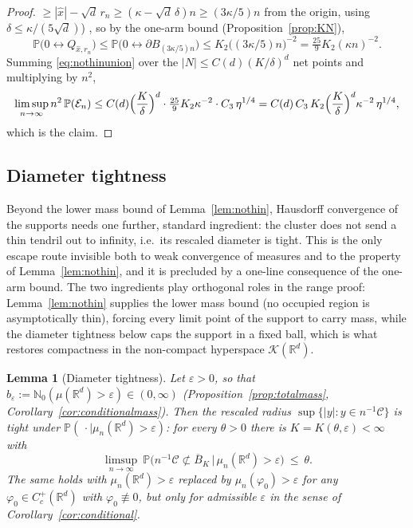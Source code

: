 \documentclass[11pt]{article}
\newtheorem{lemma}[theorem]{Lemma}
\theoremstyle{definition}
\theoremstyle{remark}
\newcommand{\R}{\mathbb{R}}
\newcommand{\bP}{\mathbb{P}}
\newcommand{\bN}{{\mathbb{N}_0}}                 %
\newcommand{\Cc}{C_c^+(\R^d)}
\newcommand{\eps}{\varepsilon}
\numberwithin{equation}{section}
\theoremstyle{plain}
\theoremstyle{definition}
\theoremstyle{remark}
\theoremstyle{plain}
\begin{document}
\begin{proof}
$\ge|\hat x|-\sqrt d\,r_n\ge(\kappa-\sqrt d\,\delta)n\ge(3\kappa/5)n$ from
the origin, using $\delta\le\kappa/(5\sqrt d)$)%
, so
by the one-arm bound (Proposition~\ref{prop:KN}),
\[
\bP\bigl(0\leftrightarrow Q_{\hat x,r_n}\bigr)
\le\bP\bigl(0\leftrightarrow\partial B_{(3\kappa/5)n}\bigr)
\le K_2\bigl((3\kappa/5)n\bigr)^{-2}=\tfrac{25}{9}K_2(\kappa n)^{-2}.
\]
Summing \eqref{eq:nothinunion} over the $|N|\le C(d)(K/\delta)^d$ net points
and multiplying by $n^2$,
\[
\limsup_{n\to\infty} n^2\,\bP(\mathcal E_n)
\le C(d)\Bigl(\frac K\delta\Bigr)^d\cdot \tfrac{25}{9}K_2\kappa^{-2}\cdot C_3\,\eta^{1/4}
= C(d)\,C_3\,K_2\Bigl(\frac K\delta\Bigr)^d\kappa^{-2}\,\eta^{1/4},
\]
which is the claim.
\end{proof}

\subsection{Diameter tightness}

Beyond the lower mass bound of Lemma~\ref{lem:nothin}, Hausdorff
convergence of the supports needs one further, standard ingredient: the cluster
does not send a thin tendril out to infinity, i.e.\ its rescaled diameter is
tight. This is the only escape route invisible both to weak convergence of
measures and to the property of Lemma~\ref{lem:nothin}, and it is
precluded by a one-line consequence of the one-arm bound. The two ingredients play orthogonal
roles in the range proof: Lemma~\ref{lem:nothin} supplies the lower mass bound
(no occupied region is asymptotically thin), forcing every limit point of the
support to carry mass, while the diameter tightness below caps the support in a
fixed ball, which is what restores compactness in the non-compact hyperspace
$\mathcal K(\R^d)$.

\begin{lemma}[Diameter tightness]\label{lem:diamtight}
Let $\eps>0$, so that
$b_\eps:=\bN(\mu(\R^d)>\eps)\in(0,\infty)$ (Proposition~\ref{prop:totalmass},
Corollary~\ref{cor:conditionalmass}). Then the rescaled radius
$\sup\{|y|:y\in n^{-1}\mathcal C\}$ is tight under
$\bP(\,\cdot\mid\mu_n(\R^d)>\eps)$: for every $\theta>0$ there is
$K=K(\theta,\eps)<\infty$ with
\[
\limsup_{n\to\infty}\
\bP\bigl(n^{-1}\mathcal C\not\subset\overline B_K\,\big|\,\mu_n(\R^d)>\eps\bigr)\ \le\ \theta .
\]
The same holds with $\mu_n(\R^d)>\eps$ replaced by $\mu_n(\varphi_0)>\eps$ for
any $\varphi_0\in\Cc$ with $\varphi_0\not\equiv0$, but only for admissible $\eps$ in the
sense of Corollary~\ref{cor:conditional}.
\end{lemma}
\end{document}
